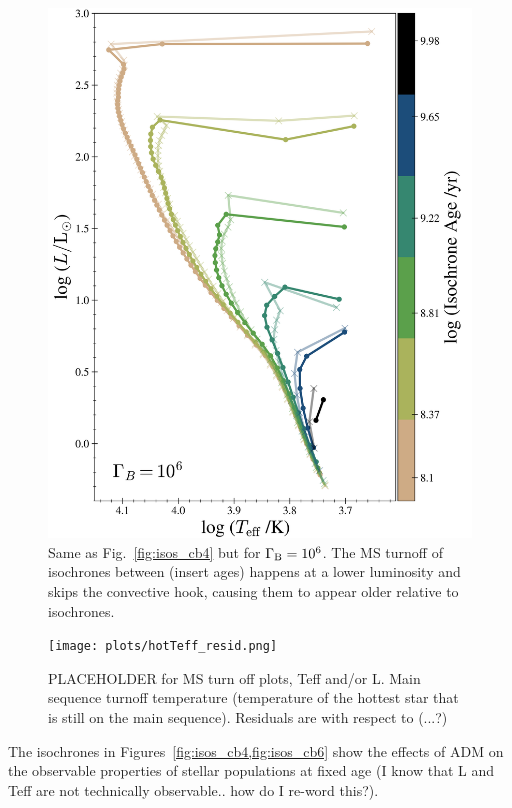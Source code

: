 \documentclass[useAMS,usenatbib]{mnras}
\begin{document}
\begin{figure}
  \centering
  \includegraphics[width=\textwidth]{plots/isos_cb6.png}
  \caption{Same as Fig.~\ref{fig:isos_cb4} but for $\Gamma_\mathrm{B} = 10^{6}$. The MS turnoff of isochrones between (insert ages) happens at a lower luminosity and skips the convective hook, causing them to appear older relative to \nodm isochrones.
  }
  \label{fig:isos_cb6}
\end{figure}


\begin{figure}
    \centering
    \texttt{[image: plots/hotTeff\_resid.png]}
    \caption{ PLACEHOLDER for MS turn off plots, Teff and/or L.
    Main sequence turnoff temperature (temperature of the hottest star that is still on the main sequence). Residuals are with respect to (...?)
    }
    \label{fig:hotTeff}

\end{figure}


The isochrones in Figures~\ref{fig:isos_cb4,fig:isos_cb6} show the effects of ADM on the observable properties of stellar populations at fixed age (I know that L and Teff are not technically observable.. how do I re-word this?).
\end{document}
